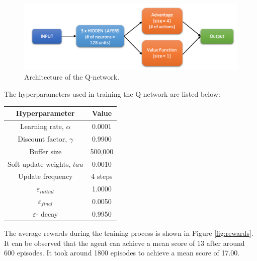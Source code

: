 \documentclass[12pt,twoside]{article}
\begin{document}
\begin{figure}[H]
	\begin{center}
		\includegraphics[width = 1\hsize]{./figures/Architecture.png} 
		\caption{Architecture of the Q-network.} %
		\label{fig:architecture} %
	\end{center}
\end{figure}

The hyperparameters used in training the Q-network are listed below:
\begin{center}
	\begin{tabular}{|c|c|}
	\hline
		Hyperparameter						& Value\\\hline
		Learning rate, $\alpha$				& 0.0001 \\
		Discount factor, $\gamma$		& 0.9900 \\
		Buffer size								& 500,000\\
		Soft update weights, $tau$		& 0.0010\\
		Update frequency						& 4 steps\\
		$\varepsilon_{initial}$				& 1.0000\\
		$\varepsilon_{final}$					& 0.0050\\
		$\varepsilon$- decay				& 0.9950\\\hline
	\end{tabular}
\end{center}
	
The average rewards during the training process is shown in Figure \ref{fig:rewards}. It can be observed that the agent can achieve a mean score of 13 after around 600 episodes. It took around 1800 episodes to achieve a mean score of 17.00.
	
\end{document}
